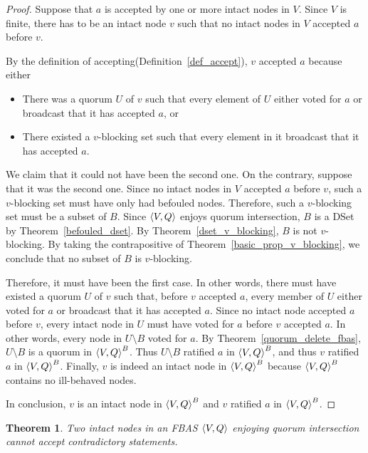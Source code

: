 \documentclass[12pt, psamsfonts]{amsart}
\newtheorem{thm}{Theorem}[subsection]
\theoremstyle{definition}
\theoremstyle{remark}
\numberwithin{equation}{subsection}
\begin{document}
\begin{proof}
    Suppose that $a$ is accepted by one or more intact nodes in $V$.
    Since $V$ is finite, there has to be an intact node $v$ such that no intact nodes in $V$ accepted $a$ before $v$.

    By the definition of accepting(Definition~\ref{def_accept}), $v$ accepted $a$ because either
    \begin{itemize}
        \item
            There was a quorum $U$ of $v$ such that every element of $U$ either voted for $a$ or broadcast that it has accepted $a$, or
        \item
            There existed a $v$-blocking set such that every element in it broadcast that it has accepted $a$.
    \end{itemize}
    We claim that it could not have been the second one.
    On the contrary, suppose that it was the second one.
    Since no intact nodes in $V$ accepted $a$ before $v$, such a $v$-blocking set must have only had befouled nodes.
    Therefore, such a $v$-blocking set must be a subset of $B$.
    Since $\ev{V, Q}$ enjoys quorum intersection, $B$ is a DSet by Theorem~\ref{befouled_dset}.
    By Theorem~\ref{dset_v_blocking}, $B$ is not $v$-blocking.
    By taking the contrapositive of Theorem~\ref{basic_prop_v_blocking}, we conclude that no subset of $B$ is $v$-blocking.

    Therefore, it must have been the first case.
    In other words, there must have existed a quorum $U$ of $v$ such that, before $v$ accepted $a$, every member of $U$ either voted for $a$ or broadcast that it has accepted $a$.
    Since no intact node accepted $a$ before $v$, every intact node in $U$ must have voted for $a$ before $v$ accepted $a$.
    In other words, every node in $U \setminus B$ voted for $a$.
    By Theorem~\ref{quorum_delete_fbas}, $U \setminus B$ is a quorum in $\ev{V, Q}^B$.
    Thus  $U \setminus B$ ratified $a$ in ${\ev{V, Q}}^B$, and thus $v$ ratified $a$ in $\ev{V, Q}^B$.
    Finally, $v$ is indeed an intact node in ${\ev{V, Q}}^B$ because ${\ev{V, Q}}^B$ contains no ill-behaved nodes.

    In conclusion, $v$ is an intact node in $\ev{V, Q}^B$ and $v$ ratified $a$ in $\ev{V, Q}^B$.
\end{proof}

\begin{thm}\label{intact_accept_contradictory}
    Two intact nodes in an FBAS $\ev{V, Q}$ enjoying quorum intersection cannot accept contradictory statements.
\end{thm}
\end{document}
